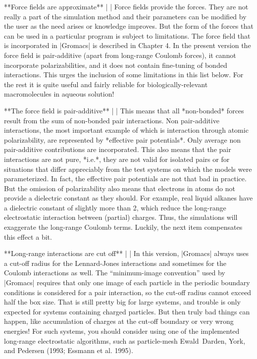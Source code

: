 **Force fields are approximate**
    | 
    | Force fields provide the forces. They are not really a part of the
      simulation method and their parameters can be modified by the user
      as the need arises or knowledge improves. But the form of the
      forces that can be used in a particular program is subject to
      limitations. The force field that is incorporated in |Gromacs| is
      described in Chapter 4. In the present version the force field is
      pair-additive (apart from long-range Coulomb forces), it cannot
      incorporate polarizabilities, and it does not contain fine-tuning
      of bonded interactions. This urges the inclusion of some
      limitations in this list below. For the rest it is quite useful
      and fairly reliable for biologically-relevant macromolecules in
      aqueous solution!

**The force field is pair-additive**
    | 
    | This means that all *non-bonded* forces result from the sum of
      non-bonded pair interactions. Non pair-additive interactions, the
      most important example of which is interaction through atomic
      polarizability, are represented by *effective pair potentials*.
      Only average non pair-additive contributions are incorporated.
      This also means that the pair interactions are not pure, *i.e.*,
      they are not valid for isolated pairs or for situations that
      differ appreciably from the test systems on which the models were
      parameterized. In fact, the effective pair potentials are not that
      bad in practice. But the omission of polarizability also means
      that electrons in atoms do not provide a dielectric constant as
      they should. For example, real liquid alkanes have a dielectric
      constant of slightly more than 2, which reduce the long-range
      electrostatic interaction between (partial) charges. Thus, the
      simulations will exaggerate the long-range Coulomb terms. Luckily,
      the next item compensates this effect a bit.

**Long-range interactions are cut off**
    | 
    | In this version, |Gromacs| always uses a cut-off radius for the
      Lennard-Jones interactions and sometimes for the Coulomb
      interactions as well. The “minimum-image convention” used by
      |Gromacs| requires that only one image of each particle in the
      periodic boundary conditions is considered for a pair interaction,
      so the cut-off radius cannot exceed half the box size. That is
      still pretty big for large systems, and trouble is only expected
      for systems containing charged particles. But then truly bad
      things can happen, like accumulation of charges at the cut-off
      boundary or very wrong energies! For such systems, you should
      consider using one of the implemented long-range electrostatic
      algorithms, such as particle-mesh Ewald Darden, York, and Pedersen
      (1993; Essmann et al. 1995).

